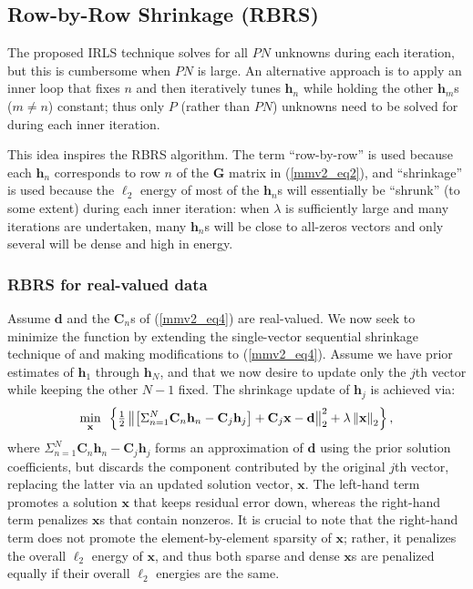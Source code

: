 \documentclass[final]{siamltex}
\newcommand{\la}[1]{\mbox{$\mathbf{#1}$}}  \newcommand{\sst}[1]{\mbox{\scriptsize{#1}}}
\begin{document}
\subsection{Row-by-Row Shrinkage (RBRS)}

    The proposed IRLS technique solves for all $PN$ unknowns during
    each iteration, but this is cumbersome when $PN$ is large.  An
    alternative approach is to apply an inner loop that fixes $n$ and
    then iteratively tunes $\la{h}_n$ while holding the other
    $\la{h}_m$s ($m \neq n$) constant; thus only $P$ (rather than
    $PN$) unknowns need to be solved for during each inner iteration.

    This idea inspires the RBRS algorithm.  The term ``row-by-row'' is
    used because each $\la{h}_n$ corresponds to row $n$ of the
    $\la{G}$ matrix in (\ref{mmv2_eq2}), and ``shrinkage'' is used
    because the $\ell_2$ energy of most of the $\la{h}_n$s will
    essentially be ``shrunk'' (to some extent) during each inner
    iteration: when $\lambda$ is sufficiently large and many
    iterations are undertaken, many $\la{h}_n$s will be close to
    all-zeros vectors and only several will be dense and high in
    energy.

    \subsubsection{RBRS for real-valued data} Assume $\la{d}$ and the
    $\la{C}_n$s of (\ref{mmv2_eq4}) are real-valued.  We now seek to
    minimize the function by extending the single-vector sequential
    shrinkage technique of \cite{Ela2006_TransIT} and making
    modifications to (\ref{mmv2_eq4}).  Assume we have prior estimates
    of $\la{h}_1$ through $\la{h}_N$, and that we now desire to update
    only the $j$th vector while keeping the other $N - 1$ fixed.  The
    shrinkage update of $\la{h}_j$ is achieved via:
    \begin{equation}\label{rbrs1}
      \mathop{\mbox{min}}_{\mbox{\scriptsize{$\la{x}$}}}
      \mbox{  }
       \left \{ \tfrac{1}{2}
       \left \Vert \left [ \Sigma_{n=1}^N \la{C}_n \la{h}_n - \la{C}_j  \la{h}_j \right ]
                            + \la{C}_j \la{x} - \la{d} \right \Vert_2^2
                 + \lambda \left \Vert \la{x} \right \Vert_2
       \right \},
    \end{equation}
    where $\Sigma_{n=1}^N \la{C}_n \la{h}_n - \la{C}_j \la{h}_j$ forms
    an approximation of \la{d} using the prior solution coefficients,
    but discards the component contributed by the original $j$th
    vector, replacing the latter via an updated solution vector,
    \la{x}.  The left-hand term promotes a solution \la{x} that keeps
    residual error down, whereas the right-hand term penalizes
    \la{x}s that contain nonzeros.  It is crucial to note that the
    right-hand term does not promote the element-by-element sparsity
    of \la{x}; rather, it penalizes the overall $\ell_2$ energy of
    \la{x}, and thus both sparse and dense \la{x}s are penalized
    equally if their overall $\ell_2$ energies are the same.
\end{document}
